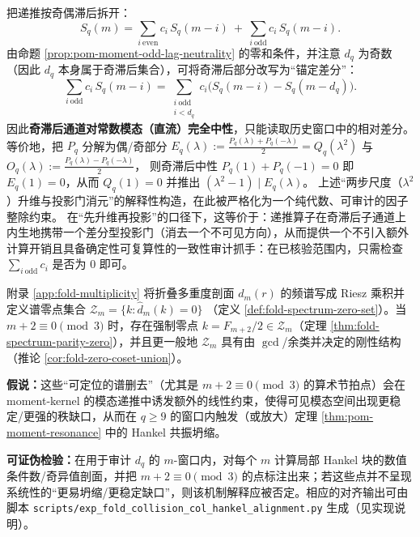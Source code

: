 \begin{remark}\label{rem:pom-moment-odd-lag-neutrality-gate}
把递推按奇偶滞后拆开：
\[
S_q(m)=\sum_{i\ \mathrm{even}}c_i\,S_q(m-i)\ +\ \sum_{i\ \mathrm{odd}}c_i\,S_q(m-i).
\]
由命题 \ref{prop:pom-moment-odd-lag-neutrality} 的零和条件，并注意 \(d_q\) 为奇数（因此 \(d_q\) 本身属于奇滞后集合），可将奇滞后部分改写为“锚定差分”：
\[
\sum_{i\ \mathrm{odd}}c_i\,S_q(m-i)
=\sum_{\substack{i\ \mathrm{odd}\\ i<d_q}}c_i\bigl(S_q(m-i)-S_q(m-d_q)\bigr).
\]
因此\textbf{奇滞后通道对常数模态（直流）完全中性}，只能读取历史窗口中的相对差分。
等价地，把 \(P_q\) 分解为偶/奇部分
\(
E_q(\lambda):=\frac{P_q(\lambda)+P_q(-\lambda)}{2}=Q_q(\lambda^2)
\)
与
\(
O_q(\lambda):=\frac{P_q(\lambda)-P_q(-\lambda)}{2}
\)，
则奇滞后中性 \(P_q(1)+P_q(-1)=0\) 即 \(E_q(1)=0\)，从而 \(Q_q(1)=0\) 并推出 \((\lambda^2-1)\mid E_q(\lambda)\)。
上述“两步尺度（\(\lambda^2\)）升维与投影门消元”的解释性构造，在此被严格化为一个纯代数、可审计的因子整除约束。
在“先升维再投影”的口径下，这等价于：递推算子在奇滞后子通道上内生地携带一个差分型投影门（消去一个不可见方向），从而提供一个不引入额外计算开销且具备确定性可复算性的一致性审计抓手：在已核验范围内，只需检查 \(\sum_{i\ \mathrm{odd}}c_i\) 是否为 \(0\) 即可。
\end{remark}

\begin{conjecture}\label{conj:pom-fourier-zero-driven-resonance}
附录 \ref{app:fold-multiplicity} 将折叠多重度剖面 \(d_m(r)\) 的频谱写成 Riesz 乘积并定义谱零点集合
\(
\mathcal{Z}_m=\{k:\widehat d_m(k)=0\}
\)
（定义 \ref{def:fold-spectrum-zero-set}）。当 \(m+2\equiv 0\pmod 3\) 时，存在强制零点 \(k=F_{m+2}/2\in\mathcal{Z}_m\)（定理 \ref{thm:fold-spectrum-parity-zero}），并且更一般地 \(\mathcal{Z}_m\) 具有由 \(\gcd\)/余类并决定的刚性结构（推论 \ref{cor:fold-zero-coset-union}）。
\par
\textbf{假说：}这些“可定位的谱删去”（尤其是 \(m+2\equiv 0\pmod 3\) 的算术节拍点）会在 moment-kernel 的模态递推中诱发额外的线性约束，使得可见模态空间出现更稳定/更强的秩缺口，从而在 \(q\ge 9\) 的窗口内触发（或放大）定理 \ref{thm:pom-moment-resonance} 中的 Hankel 共振坍缩。
\par
\textbf{可证伪检验：}在用于审计 \(d_q\) 的 \(m\)-窗口内，对每个 \(m\) 计算局部 Hankel 块的数值条件数/奇异值剖面，并把 \(m+2\equiv 0\pmod 3\) 的点标注出来；若这些点并不呈现系统性的“更易坍缩/更稳定缺口”，则该机制解释应被否定。相应的对齐输出可由脚本 \texttt{scripts/exp\_fold\_collision\_col\_hankel\_alignment.py} 生成（见实现说明）。
\end{conjecture}

